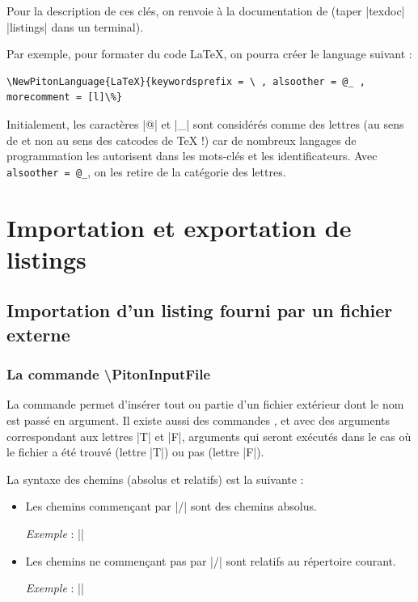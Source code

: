 \documentclass[dvipsnames,svgnames]{article}
\begin{document}
Pour la description de ces clés, on renvoie à la documentation de  (taper
|texdoc| |listings| dans un terminal).

\bigskip
Par exemple, pour formater du code LaTeX, on pourra créer le language suivant : 
%
{\color{gray}
\begin{verbatim}
\NewPitonLanguage{LaTeX}{keywordsprefix = \ , alsoother = @_ , morecomment = [l]\%}
\end{verbatim}
} 

Initialement, les caractères |@| et |_| sont considérés comme des lettres (au
sens de  et non au sens des catcodes de TeX !) car de nombreux
langages de programmation les autorisent dans les mots-clés et les
identificateurs. Avec \verb|alsoother = @_|, on les retire de la catégorie des
lettres.

\section{Importation et exportation de listings}

\subsection{Importation d'un listing fourni par un fichier externe}

\label{PitonInputFile}

\subsubsection{La commande \textbackslash PitonInputFile}


La commande  permet d'insérer tout ou partie d'un
fichier extérieur dont le nom est passé en argument. Il existe aussi des commandes
,  et
 avec des arguments correspondant aux lettres |T| et
|F|, arguments qui seront exécutés dans le cas où le fichier a été trouvé (lettre |T|) ou
pas (lettre |F|).

\smallskip
La syntaxe des chemins (absolus et relatifs) est la suivante : 
\begin{itemize}
\item Les chemins commençant par |/| sont des chemins absolus.

\emph{Exemple} : ||

\item Les chemins ne commençant pas par |/| sont relatifs au répertoire courant.

\emph{Exemple} : ||
\end{itemize}
\end{document}
